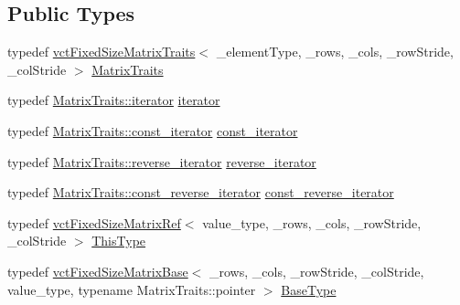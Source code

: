 \subsection*{Public Types}
\begin{DoxyCompactItemize}
\item 
typedef \hyperlink{classvct_fixed_size_matrix_traits}{vct\+Fixed\+Size\+Matrix\+Traits}$<$ \+\_\+element\+Type, \+\_\+rows, \+\_\+cols, \+\_\+row\+Stride, \+\_\+col\+Stride $>$ \hyperlink{classvct_fixed_size_matrix_ref_a9716291cd710aec62841490659e783da}{Matrix\+Traits}
\item 
typedef \hyperlink{classvct_fixed_size_matrix_traits_a677065481ada218e2559cdec92e97fd8}{Matrix\+Traits\+::iterator} \hyperlink{classvct_fixed_size_matrix_ref_ab9d9f2e3e1370846c2da44b10e4ad9f8}{iterator}
\item 
typedef \hyperlink{classvct_fixed_size_matrix_traits_a8f7178fb03f45772c705fba16e08065d}{Matrix\+Traits\+::const\+\_\+iterator} \hyperlink{classvct_fixed_size_matrix_ref_a7c8a96934427f6a5a5c410abe5c0fccb}{const\+\_\+iterator}
\item 
typedef \hyperlink{classvct_fixed_size_matrix_traits_aa132098455575ae9bc4962c994273baa}{Matrix\+Traits\+::reverse\+\_\+iterator} \hyperlink{classvct_fixed_size_matrix_ref_a052eeff62ac55a54af1179c7fd8d246f}{reverse\+\_\+iterator}
\item 
typedef \hyperlink{classvct_fixed_size_matrix_traits_a362cff0931f811552609307e80af3eab}{Matrix\+Traits\+::const\+\_\+reverse\+\_\+iterator} \hyperlink{classvct_fixed_size_matrix_ref_acfd6ce4ca9ac345fc5ed261df8743c42}{const\+\_\+reverse\+\_\+iterator}
\item 
typedef \hyperlink{classvct_fixed_size_matrix_ref}{vct\+Fixed\+Size\+Matrix\+Ref}$<$ value\+\_\+type, \+\_\+rows, \+\_\+cols, \+\_\+row\+Stride, \+\_\+col\+Stride $>$ \hyperlink{classvct_fixed_size_matrix_ref_a29a621c8e22f250f9033e539ad219f95}{This\+Type}
\item 
typedef \hyperlink{classvct_fixed_size_matrix_base}{vct\+Fixed\+Size\+Matrix\+Base}$<$ \+\_\+rows, \+\_\+cols, \+\_\+row\+Stride, \+\_\+col\+Stride, value\+\_\+type, typename Matrix\+Traits\+::pointer $>$ \hyperlink{classvct_fixed_size_matrix_ref_a83c7be1d6fbc75488c082cb53ebcb2ed}{Base\+Type}
\end{DoxyCompactItemize}
